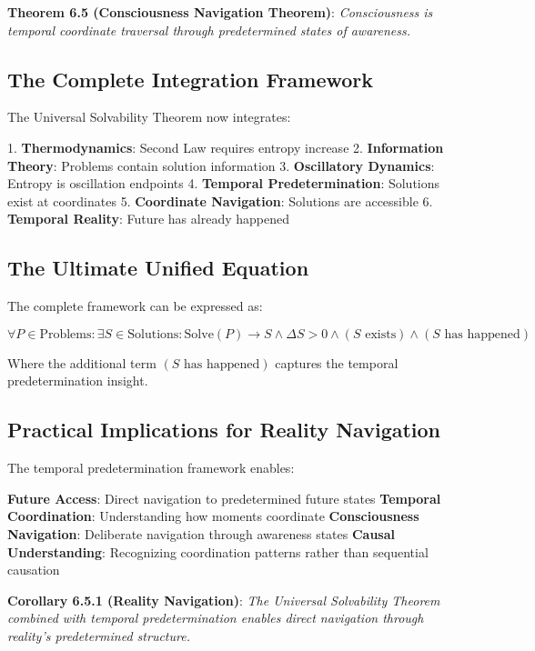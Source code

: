 \documentclass[12pt,a4paper]{article}
\theoremstyle{definition}
\begin{document}
{\textbf{Theorem 6.5 (Consciousness Navigation Theorem)}: \textit{Consciousness is temporal coordinate traversal through predetermined states of awareness.}

\subsection{The Complete Integration Framework}

The Universal Solvability Theorem now integrates:

1. \textbf{Thermodynamics}: Second Law requires entropy increase
2. \textbf{Information Theory}: Problems contain solution information
3. \textbf{Oscillatory Dynamics}: Entropy is oscillation endpoints
4. \textbf{Temporal Predetermination}: Solutions exist at coordinates
5. \textbf{Coordinate Navigation}: Solutions are accessible
6. \textbf{Temporal Reality}: Future has already happened

\subsection{The Ultimate Unified Equation}

The complete framework can be expressed as:

$$\forall P \in \text{Problems}: \exists S \in \text{Solutions}: \text{Solve}(P) \rightarrow S \land \Delta S > 0 \land (S \text{ exists}) \land (S \text{ has happened})$$

Where the additional term $(S \text{ has happened})$ captures the temporal predetermination insight.

\subsection{Practical Implications for Reality Navigation}

The temporal predetermination framework enables:

\textbf{Future Access}: Direct navigation to predetermined future states
\textbf{Temporal Coordination}: Understanding how moments coordinate
\textbf{Consciousness Navigation}: Deliberate navigation through awareness states
\textbf{Causal Understanding}: Recognizing coordination patterns rather than sequential causation

\textbf{Corollary 6.5.1 (Reality Navigation)}: \textit{The Universal Solvability Theorem combined with temporal predetermination enables direct navigation through reality's predetermined structure.}

}
\end{document}
